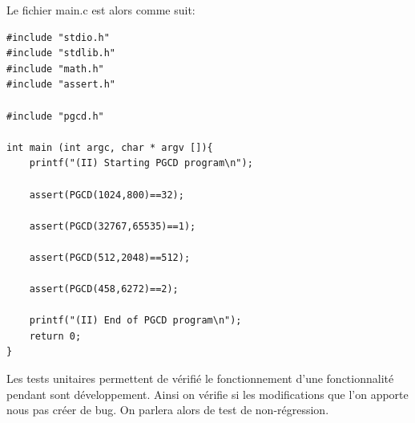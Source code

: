 \documentclass[a4paper]{article}
\begin{document}
        Le fichier main.c est alors comme suit:
\begin{lstlisting}[style=CStyle]
#include "stdio.h"
#include "stdlib.h"
#include "math.h"
#include "assert.h"

#include "pgcd.h"

int main (int argc, char * argv []){
    printf("(II) Starting PGCD program\n");

    assert(PGCD(1024,800)==32);
    
    assert(PGCD(32767,65535)==1);
    
    assert(PGCD(512,2048)==512);
    
    assert(PGCD(458,6272)==2);

    printf("(II) End of PGCD program\n");
    return 0;
}
\end{lstlisting}

        Les tests unitaires permettent de vérifié le fonctionnement d'une fonctionnalité pendant sont développement. 
        Ainsi on vérifie si les modifications que l'on apporte nous pas créer de bug.
        On parlera alors de test de non-régression.
\newpage
\end{document}
